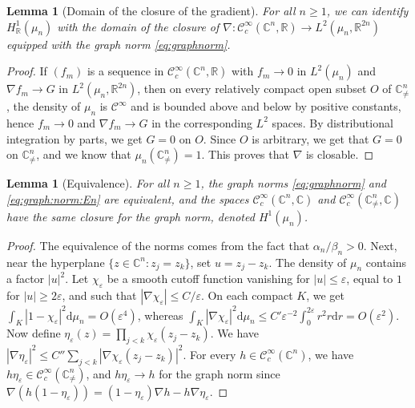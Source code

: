 \documentclass[11pt,reqno]{amsart}
\numberwithin{equation}{section}%
\numberwithin{figure}{section}%
\numberwithin{table}{section}
\theoremstyle{plain}
\newtheorem{lemma}[theorem]{Lemma}
\theoremstyle{definition}
\begin{document}
\begin{lemma}[Domain of the closure of the gradient]\label{le:gradient:closure:domain}
  For all $n\geq1$, we can identify $H^1_{\mathbb{R}}(\mu_n)$ with the domain
  of the closure of
  $\nabla:\mathcal{C}^\infty_c(\mathbb{C}^n,\mathbb{R})\to
  L^2(\mu_n,\mathbb{R}^{2n})$ equipped with the graph norm
  \eqref{eq:graphnorm}.
\end{lemma}

\begin{proof}
  If ${(f_m)}$ is a sequence in
  $\mathcal{C}^\infty_c(\mathbb{C}^n,\mathbb{R})$ with $f_m\to 0$ in
  $L^2(\mu_n)$ and $\nabla f_m\to G$ in $L^2(\mu_n,\mathbb{R}^{2n})$, then on
  every relatively compact open subset $O$ of $\mathbb{C}^n_{\neq}$, the
  density of $\mu_n$ is $\mathcal{C}^\infty$ and is bounded above and below by
  positive constants, hence $f_m\to0$ and $\nabla f_m\to G$ in the
  corresponding $L^2$ spaces. By distributional integration by parts, we get
  $G=0$ on $O$. Since $O$ is arbitrary, we get that $G=0$ on
  $\mathbb{C}^n_{\neq}$, and we know that $\mu_n(\mathbb{C}^n_{\neq})=1$. This
  proves that $\nabla$ is closable.
\end{proof}

\begin{lemma}[Equivalence]\label{le:closure}
  For all $n\geq1$, the graph norms \eqref{eq:graphnorm} and
  \eqref{eq:graph:norm:En} are equivalent, and the spaces
  $\mathcal{C}^\infty_c(\mathbb{C}^n,\mathbb{C})$ and
  $\mathcal{C}^\infty_c(\mathbb{C}^n_{\neq},\mathbb{C})$ have the same closure
  for the graph norm, denoted $H^1(\mu_n)$.
\end{lemma}

\begin{proof}
  The equivalence of the norms comes from the fact that $\alpha_n/\beta_n>0$.
  Next, near the hyperplane $\{z\in\mathbb{C}^n:z_j=z_k\}$, set $u=z_j-z_k$.
  The density of $\mu_n$ contains a factor $|u|^2$. Let $\chi_\varepsilon$ be
  a smooth cutoff function vanishing for $|u|\leq\varepsilon$, equal to $1$
  for $|u|\geq2\varepsilon$, and such that
  $|\nabla\chi_\varepsilon|\leq C/\varepsilon$. On each compact $K$, we get
  $\int_K|1-\chi_\varepsilon|^2\mathrm{d}\mu_n=O(\varepsilon^4)$, whereas
  $\int_K|\nabla\chi_\varepsilon|^2\mathrm{d}\mu_n\leq
  C'\varepsilon^{-2}\int_0^{2\varepsilon}r^2r\mathrm{d}r=O(\varepsilon^2)$.
  Now define $\eta_\varepsilon(z)=\prod_{j<k}\chi_\varepsilon(z_j-z_k)$. We
  have
  $|\nabla\eta_\varepsilon|^2\leq
  C''\sum_{j<k}|\nabla\chi_\varepsilon(z_j-z_k)|^2$. For every
  $h\in\mathcal{C}^\infty_c(\mathbb{C}^n)$, we have
  $h\eta_\varepsilon\in\mathcal{C}^\infty_c(\mathbb{C}^n_{\neq})$, and
  $h\eta_\varepsilon\to h$ for the graph norm since
  $\nabla(h(1-\eta_\varepsilon))=(1-\eta_\varepsilon)\nabla
  h-h\nabla\eta_\varepsilon$.
\end{proof}
\end{document}
